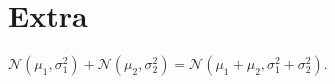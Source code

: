 \section*{Extra}
$\mathcal{N}(\mu_1,\sigma^2_1)+\mathcal{N}(\mu_2,\sigma^2_2)=\mathcal{N}(\mu_1+\mu_2,\sigma_1^2+\sigma_2^2)$.

